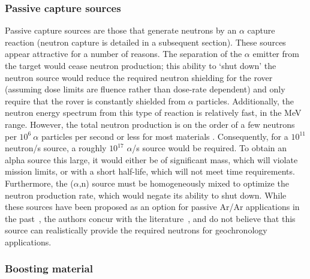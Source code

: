 \documentclass{mc2015}
\begin{document}
\subsubsection{Passive capture sources}

Passive capture sources \cite{weise_neutron_1984,jacobs_energy_1983,marsh_high_1995} are those that generate neutrons by an $\alpha$ capture reaction (neutron capture is detailed in a subsequent section). These sources appear attractive for a number of reasons. The separation of the $\alpha$ emitter from the target would cease neutron production; this ability to `shut down' the neutron source would reduce the required neutron shielding for the rover (assuming dose limits are fluence rather than dose-rate dependent) and only require that the rover is constantly shielded from $\alpha$ particles.  Additionally, the neutron energy spectrum from this type of reaction is relatively fast, in the MeV range. However, the total neutron production is on the order of a few  neutrons per $10^6\:\alpha$ particles per second or less for most materials \cite{weise_neutron_1984,jacobs_energy_1983}. Consequently, for a $10^{11}$ neutron/s source, a roughly $10^{17}$ $\alpha$/s source would be required. To obtain an alpha source this large, it would either be of significant mass, which will violate mission limits, or with a short half-life, which will not meet time requirements. Furthermore, the ($\alpha$,n) source must be homogeneously mixed to optimize the neutron production rate, which would negate its ability to shut down. While these sources have been proposed as an option for passive Ar/Ar applications in the past~\cite{li_evaluation_2011}, the authors concur with the literature~\cite{li_evaluation_2011}, and do not believe that this source can realistically provide the required neutrons for geochronology applications. 

\subsubsection{Boosting material}
\end{document}
